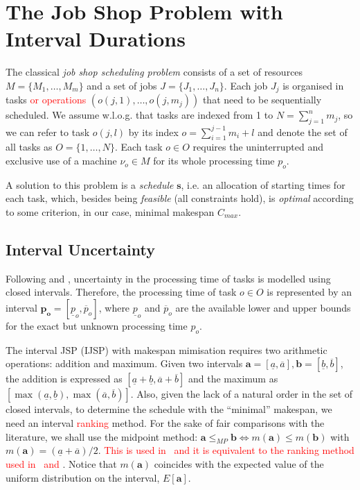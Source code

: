 \documentclass[sn-mathphys]{sn-jnl}%
\theoremstyle{thmstyleone}%
\theoremstyle{thmstyletwo}%
\theoremstyle{thmstylethree}%
\newcommand{\review}[1]{\textcolor{red}{#1}} %
\begin{document}
\section{The Job Shop Problem with Interval Durations}\label{secIJSP}
The classical \emph{job shop scheduling problem} consists of a set of resources $M=\{M_1, \dots, M_m\}$ and a set of jobs $J=\{J_1,\dots,J_n\}$. Each job $J_j$ is organised in tasks \review{or operations} $(o(j,1),\dots,o(j,m_j))$ that need to be sequentially scheduled. We assume w.l.o.g. that tasks are indexed from 1 to $N=\sum_{j=1}^n m_j$, so we can refer to task $o(j,l)$ by its index $o=\sum_{i=1}^{j-1} m_i+l$ and denote the set of all tasks as $O=\{1,\dots, N\}$. Each task $o \in O$ requires the uninterrupted and exclusive use of a machine $\nu_o \in M$ for its whole processing time $p_o$.

A solution to this problem is a \emph{schedule} $\boldsymbol{s}$, i.e. an allocation of starting times for each task, which, besides being \emph{feasible} (all constraints hold), is \emph{optimal} according to some criterion, in our case, minimal makespan $C_{max}$.

\subsection{Interval Uncertainty} \label{subsecIntervalDurations}
Following \cite{Lei2011} and \cite{Diaz2020genetic}, uncertainty in the processing time of tasks is modelled using closed intervals. Therefore, the processing time of task $o \in O$ is represented by an interval $\mathbf{p_o}=[\underline{p}_o,\overline{p}_o]$, where $\underline{p}_o$ and $\overline{p}_o$ are the available lower and upper bounds for the exact but unknown processing time $p_o$.

The interval JSP (IJSP) with makespan mimisation requires two arithmetic operations: addition and maximum. Given two intervals $\mathbf{a}=[\underline{a},\overline{a}], \mathbf{b}=[\underline{b},\overline{b}]$, the addition is expressed as $[\underline{a}+\underline{b}, \overline{a}+\overline{b}]$ and the maximum as $[\max(\underline{a}, \underline{b}), \max(\overline{a}, \overline{b})]$. Also, given the lack of a natural order in the set of closed intervals, to determine the schedule with the ``minimal'' makespan, we need an interval \review{ranking} method. For the sake of fair comparisons with the literature, we shall use the midpoint method: $\mathbf{a} \leq_{MP} \mathbf{b} \Leftrightarrow m(\mathbf{a}) \leq m(\mathbf{b}) $ with $ m(\mathbf{a}) =(\underline{a}+\overline{a})/2$. \review{This is used in~\cite{Diaz2020genetic, Diaz2022, Diaz2023-ICAE} and it is equivalent to the ranking method used in~\cite{Lei2012c} and \cite{Lei2011}}. Notice that $m(\mathbf{a})$ coincides with the expected value of the uniform distribution on the interval, $E[\mathbf{a}]$.
\end{document}
